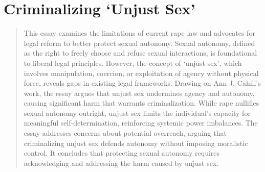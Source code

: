 \chapter{Criminalizing `Unjust Sex'}

\titleformat{\section}[block]{\normalfont\scshape\large\bfseries}{}{0pt}{}
\begin{quote}
    
This essay examines the limitations of current rape law and advocates
for legal reform to better protect sexual autonomy. Sexual autonomy,
defined as the right to freely choose and refuse sexual interactions, is
foundational to liberal legal principles. However, the concept of
`unjust sex', which involves manipulation, coercion, or exploitation of
agency without physical force, reveals gaps in existing legal
frameworks. Drawing on Ann J. Cahill's work, the essay argues that
unjust sex undermines agency and autonomy, causing significant harm that
warrants criminalization. While rape nullifies sexual autonomy outright,
unjust sex limits the individual's capacity for meaningful
self-determination, reinforcing systemic power imbalances. The essay
addresses concerns about potential overreach, arguing that criminalizing
unjust sex defends autonomy without imposing moralistic control. It
concludes that protecting sexual autonomy requires acknowledging and
addressing the harm caused by unjust sex.
\end{quote}

